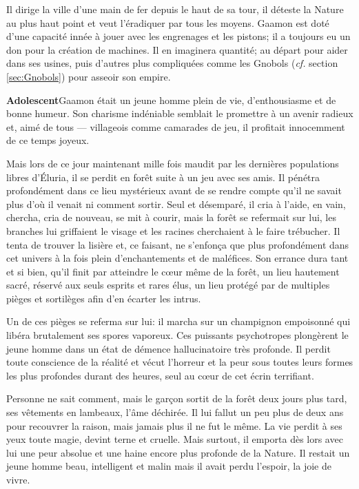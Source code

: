 Il dirige la ville d'une main de fer depuis le haut de sa tour, il déteste la Nature au plus haut point et veut l'éradiquer par tous les moyens. Gaamon est doté d'une capacité innée à jouer avec les engrenages et les pistons; il a toujours eu un don pour la création de machines. Il en imaginera quantité; au départ pour aider dans ses usines, puis d'autres plus compliquées comme les Gnobols (\textit{cf.} section \ref{sec:Gnobols}) pour asseoir son empire.

\newpage
{}
\label{sec:HistoireGaamon}
\textbf{Adolescent}\quad Gaamon était un jeune homme plein de vie, d'enthousiasme et de bonne humeur. Son charisme indéniable semblait le promettre à un avenir radieux et, aimé de tous --- villageois comme camarades de jeu, il profitait innocemment de ce temps joyeux.

Mais lors de ce jour maintenant mille fois maudit par les dernières populations libres d'Éluria, il se perdit en forêt suite à un jeu avec ses amis. Il pénétra profondément dans ce lieu mystérieux avant de se rendre compte qu'il ne savait plus d'où il venait ni comment sortir. Seul et désemparé, il cria à l'aide, en vain, chercha, cria de nouveau, se mit à courir, mais la forêt se refermait sur lui, les branches lui griffaient le visage et les racines cherchaient à le faire trébucher. Il tenta de trouver la lisière et, ce faisant, ne s'enfonça que plus profondément dans cet univers à la fois plein d'enchantements et de maléfices. Son errance dura tant et si bien, qu'il finit par atteindre le c\oe ur même de la forêt, un lieu hautement sacré, réservé aux seuls esprits et rares élus, un lieu protégé par de multiples pièges et sortilèges afin d'en écarter les intrus.

Un de ces pièges se referma sur lui: il marcha sur un champignon empoisonné qui libéra brutalement ses spores vaporeux. Ces puissants psychotropes plongèrent le jeune homme dans un état de démence hallucinatoire très profonde. Il perdit toute conscience de la réalité et vécut l'horreur et la peur sous toutes leurs formes les plus profondes durant des heures, seul au c\oe ur de cet écrin terrifiant.

Personne ne sait comment, mais le garçon sortit de la forêt deux jours plus tard, ses vêtements en lambeaux, l'âme déchirée. Il lui fallut un peu plus de deux ans pour recouvrer la raison, mais jamais plus il ne fut le même. La vie perdit à ses yeux toute magie, devint terne et cruelle. Mais surtout, il emporta dès lors avec lui une peur absolue et une haine encore plus profonde de la Nature. Il restait un jeune homme beau, intelligent et malin mais il avait perdu l'espoir, la joie de vivre.

